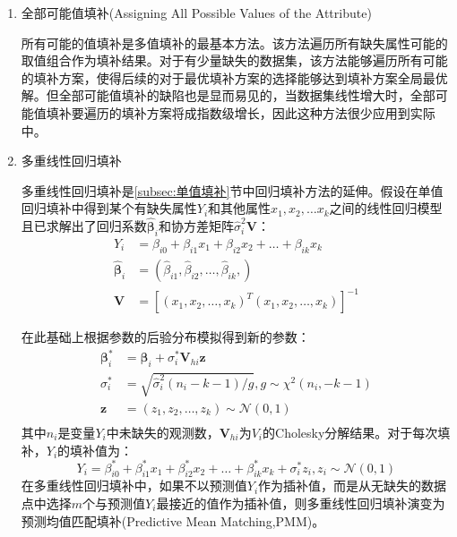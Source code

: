 \documentclass[a4paper]{ctexart}
\begin{document}
\begin{enumerate}
	\item 全部可能值填补(Assigning All Possible Values of the Attribute)\cite{RN163}

	      所有可能的值填补是多值填补的最基本方法。该方法遍历所有缺失属性可能的取值组合作为填补结果。对于有少量缺失的数据集，该方法能够遍历所有可能的填补方案，使得后续的对于最优填补方案的选择能够达到填补方案全局最优解。但全部可能值填补的缺陷也是显而易见的，当数据集线性增大时，全部可能值填补要遍历的填补方案将成指数级增长，因此这种方法很少应用到实际中。

	\item 多重线性回归填补\cite{RN178}

	      多重线性回归填补是\ref{subsec:单值填补}节中回归填补方法的延伸。假设在单值回归填补中得到某个有缺失属性$Y_i$和其他属性$x_1,x_2,\dots x_k$之间的线性回归模型且已求解出了回归系数$\hat{\bm\beta}_i$和协方差矩阵$\hat\sigma_i^2\bm V$：
	      \begin{equation}
		      \begin{split}
			      Y_i&=\beta_{i0}+\beta_{i1}x_1+\beta_{i2}x_2+\dots+\beta_{ik}x_k\\
			      \hat{\bm\beta}_i&=\left(\hat{\beta}_{i1},\hat{\beta}_{i2},\dots,\hat{\beta}_{ik},\right)\\
			      \bm V&=\left[\left(x_1,x_2,\dots,x_k\right)^T\left(x_1,x_2,\dots,x_k\right)\right]^{-1}
		      \end{split}
	      \end{equation}

	      在此基础上根据参数的后验分布模拟得到新的参数：
	      \begin{equation}
		      \begin{split}
			      \bm\beta_i^*&=\bm\beta_i+\sigma_i^*\bm V_{hi}\bm z\\
			      \sigma_i^*&=\sqrt{\hat\sigma_i^2(n_i-k-1)/g},g\sim \mathcal{\chi}^2(n_i,-k-1)\\
			      \bm z&=\left(z_1,z_2,\dots,z_k\right)\sim \mathcal{N}(0,1)\\
		      \end{split}
	      \end{equation}
	      其中$n_i$是变量$Y_i$中未缺失的观测数，$\bm V_{hi}$为$V_i$的Cholesky分解结果。对于每次填补，$Y_i$的填补值为：
	      \begin{equation}
		      Y_i=\beta^*_{i0}+\beta^*_{i1}x_1+\beta^*_{i2}x_2+\dots+\beta^*_{ik}x_k+\sigma_i^*z_i,z_i\sim \mathcal{N}(0,1)
	      \end{equation}
	      在多重线性回归填补中，如果不以预测值$Y_i$作为插补值，而是从无缺失的数据点中选择$m$个与预测值$Y_i$最接近的值作为插补值，则多重线性回归填补演变为预测均值匹配填补(Predictive Mean Matching,PMM)\cite{RN177}。


\end{enumerate}
\end{document}
